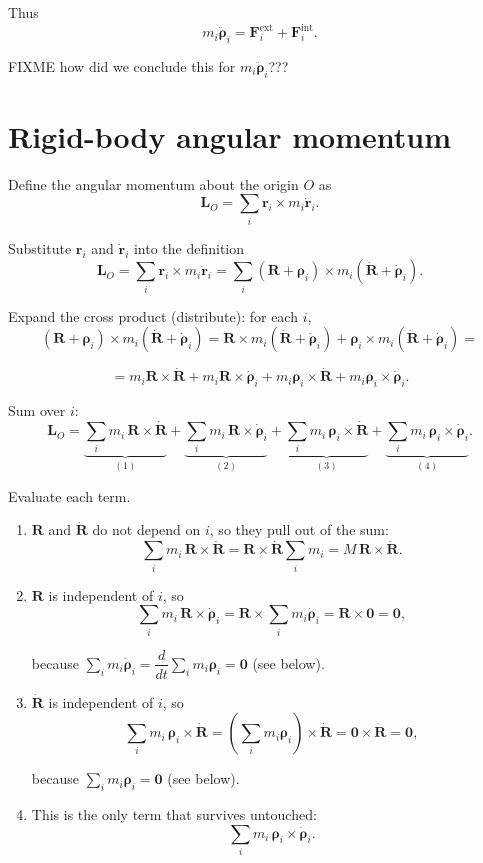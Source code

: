 \documentclass[a4paper,11pt]{article}
\begin{document}
Thus
\[
m_i\ddot{\boldsymbol\rho}_i
=
\mathbf F_i^{\mathrm{ext}}+\mathbf F_i^{\mathrm{int}}.
\]

FIXME how did we conclude this for $m_i\ddot{\boldsymbol\rho}_i$???

\section{Rigid-body angular momentum}

Define the angular momentum about the origin $O$ as
\[
\mathbf L_O
=
\sum_i \mathbf r_i\times m_i\dot{\mathbf r}_i.
\]

Substitute $\mathbf r_i$ and $\dot{\mathbf r}_i$ into the definition
\[
\mathbf L_O
=
\sum_i \mathbf r_i\times m_i\dot{\mathbf r}_i
=
\sum_i (\mathbf R+\boldsymbol\rho_i)\times m_i(\dot{\mathbf R}+\dot{\boldsymbol\rho}_i).
\]

Expand the cross product (distribute): for each $i$,
\[
(\mathbf R + \boldsymbol\rho_i) \times m_i(\dot{\mathbf R} + \dot{\boldsymbol\rho}_i)
=
\mathbf R \times m_i(\dot{\mathbf R} + \dot{\boldsymbol\rho}_i)
+
\boldsymbol\rho_i \times m_i(\dot{\mathbf R} + \dot{\boldsymbol\rho}_i)=
\]

\[
=
m_i\mathbf R \times \dot{\mathbf R}
+
m_i\mathbf R \times \dot{\boldsymbol\rho}_i
+
m_i\boldsymbol\rho_i \times \dot{\mathbf R}
+
m_i\boldsymbol\rho_i \times \dot{\boldsymbol\rho}_i.
\]

Sum over $i$:
\[
\mathbf L_O
=
 \underbrace{\sum_i m_i\,\mathbf R\times\dot{\mathbf R}}_{(1)}
+\underbrace{\sum_i m_i\,\mathbf R\times\dot{\boldsymbol\rho}_i}_{(2)}
+\underbrace{\sum_i m_i\,\boldsymbol\rho_i\times\dot{\mathbf R}}_{(3)}
+\underbrace{\sum_i m_i\,\boldsymbol\rho_i\times\dot{\boldsymbol\rho}_i}_{(4)}.
\]

Evaluate each term.

\begin{enumerate}
\item $\mathbf R$ and $\dot{\mathbf R}$ do not depend on \(i\), so they pull out of the sum:
\[
\sum_i m_i\,\mathbf R\times\dot{\mathbf R}
=
\mathbf R\times\dot{\mathbf R}\sum_i m_i
=
M\,\mathbf R\times\dot{\mathbf R}.
\]

\item $\mathbf R$ is independent of $i$, so
\[
\sum_i m_i\,\mathbf R\times\dot{\boldsymbol\rho}_i
=
\mathbf R\times\sum_i m_i\dot{\boldsymbol\rho}_i
=
\mathbf R\times\mathbf 0
=
\mathbf 0,
\]

because \(\sum_i m_i\dot{\boldsymbol\rho}_i=\dfrac{d}{dt}\sum_i m_i\boldsymbol\rho_i=\mathbf 0\) (see below).

\item $\dot{\mathbf R}$ is independent of $i$, so
\[
\sum_i m_i\,\boldsymbol\rho_i\times\dot{\mathbf R}
=
\left(\sum_i m_i\boldsymbol\rho_i\right)\times\dot{\mathbf R}
=
\mathbf 0\times\dot{\mathbf R}
=
\mathbf 0,
\]

because \(\sum_i m_i\boldsymbol\rho_i=\mathbf 0\) (see below).

\item This is the only term that survives untouched:
\[
\sum_i m_i\,\boldsymbol\rho_i\times\dot{\boldsymbol\rho}_i.
\]

\end{enumerate}
\end{document}
